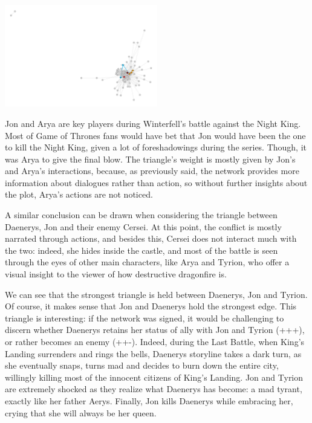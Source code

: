 \documentclass[10pt,twocolumn,letterpaper]{article}
\begin{document}
\begin{center}
    \includegraphics[width=0.5\textwidth]{img/s8/s8_triangles.jpg}
\end{center}

Jon and Arya are key players during Winterfell's battle against the Night King. Most of Game of Thrones fans would have bet that Jon would have been the one to kill the Night King, given a lot of foreshadowings during the series. Though, it was Arya to give the final blow. The triangle's weight is mostly given by Jon's and Arya's interactions, because, as previously said, the network provides more information about dialogues rather than action, so without further insights about the plot, Arya's actions are not noticed. 

A similar conclusion can be drawn when considering the triangle between Daenerys, Jon and their enemy Cersei. At this point, the conflict is mostly narrated through actions, and besides this, Cersei does not interact much with the two: indeed, she hides inside the castle, and most of the battle is seen through the eyes of other main characters, like Arya and Tyrion, who offer a visual insight to the viewer of how destructive dragonfire is.

We can see that the strongest triangle is held between Daenerys, Jon and Tyrion. Of course, it makes sense that Jon and Daenerys hold the strongest edge. This triangle is interesting: if the network was signed, it would be challenging to discern whether Daenerys retains her status of ally with Jon and Tyrion (+++), or rather becomes an enemy (++-). Indeed, during the Last Battle, when King's Landing surrenders and rings the bells, Daenerys storyline takes a dark turn, as she eventually snaps, turns mad and decides to burn down the entire city, willingly killing most of the innocent citizens of King's Landing. Jon and Tyrion are extremely shocked as they realize what Daenerys has become: a mad tyrant, exactly like her father Aerys. Finally, Jon kills Daenerys while embracing her, crying that she will always be her queen.
\end{document}
